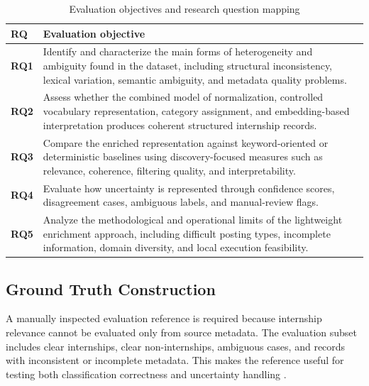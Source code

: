 \begin{table}[H]
    \centering
    \caption{Evaluation objectives and research question mapping}
    \label{tab:evaluation-objectives-rq-mapping}
    \renewcommand{\arraystretch}{1.3}
    \begin{tabular}{p{} p{}}
        \hline
        \textbf{RQ} & \textbf{Evaluation objective} \\
        \hline

        \textbf{RQ1} &
        Identify and characterize the main forms of heterogeneity and ambiguity found in the dataset, including structural inconsistency, lexical variation, semantic ambiguity, and metadata quality problems. \\

        \textbf{RQ2} &
        Assess whether the combined model of normalization, controlled vocabulary representation, category assignment, and embedding-based interpretation produces coherent structured internship records. \\

        \textbf{RQ3} &
        Compare the enriched representation against keyword-oriented or deterministic baselines using discovery-focused measures such as relevance, coherence, filtering quality, and interpretability. \\

        \textbf{RQ4} &
        Evaluate how uncertainty is represented through confidence scores, disagreement cases, ambiguous labels, and manual-review flags. \\

        \textbf{RQ5} &
        Analyze the methodological and operational limits of the lightweight enrichment approach, including difficult posting types, incomplete information, domain diversity, and local execution feasibility. \\

        \hline
    \end{tabular}
\end{table}

\subsection{Ground Truth Construction}

A manually inspected evaluation reference is required because internship relevance cannot be evaluated only from source metadata. The evaluation subset includes clear internships, clear non-internships, ambiguous cases, and records with inconsistent or incomplete metadata. This makes the reference useful for testing both classification correctness and uncertainty handling \cite{krippendorff2004content, wohlin2012experimentation}.

